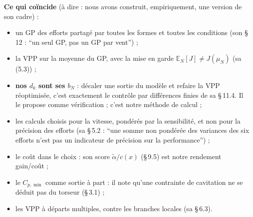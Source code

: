 \documentclass[11pt,a4paper]{article}
\begin{document}
\textbf{Ce qui coïncide} (à dire : nous avons construit, empiriquement, une version de son cadre) :
\begin{itemize}
  \item un GP des efforts partagé par toutes les formes et toutes les conditions (son § 12 : \enquote{un seul GP,
        pas un GP par vent}) ;
  \item la VPP sur la moyenne du GP, avec la mise en garde $\mathbb E_N[J]\ne J(\mu_N)$ (sa (5.3)) ;
  \item \textbf{nos $d_k$ sont ses $b_N$} : décaler une sortie du modèle et refaire la VPP réoptimisée, c'est
        exactement le contrôle par différences finies de sa §\,11.4. Il le propose comme vérification ; c'est
        notre méthode de calcul ;
  \item les calculs choisis pour la vitesse, pondérés par la sensibilité, et non pour la précision des efforts
        (sa §\,5.2 : \enquote{une somme non pondérée des variances des six efforts n'est pas un indicateur de
        précision sur la performance}) ;
  \item le coût dans le choix : son score $\tilde\alpha/c(x)$ (§\,9.5) est notre rendement gain/coût ;
  \item le $C_{p,\min}$ comme sortie à part : il note qu'une contrainte de cavitation ne se déduit pas du
        torseur (§\,3.1) ;
  \item les VPP à départs multiples, contre les branches locales (sa §\,6.3).
\end{itemize}
\end{document}

